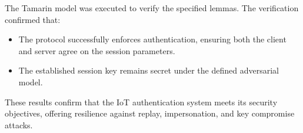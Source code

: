 The Tamarin model was executed to verify the specified lemmas. The verification confirmed that:
\begin{itemize}
    \item The protocol successfully enforces authentication, ensuring both the client and server agree on the session parameters.
    \item The established session key remains secret under the defined adversarial model.
\end{itemize}
These results confirm that the IoT authentication system meets its security objectives, offering resilience against replay, impersonation, and key compromise attacks.